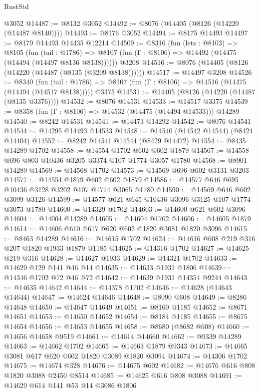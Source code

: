 \begin{lexlean}{RustStd}
\begin{coremodule}
    @3052
@14487 := @8132 @3052
@14492 := @8076 (@14405 (@8126 (@14220 (@14487 @8140))))
@14493 := @8176 @3052
@14494 := @8175 @14493
@14497 := @8179 @14493 @14435 @12214
@14509 := @8316
    (fun (lets : @8103) =>
    @8105
      (fun (tail : @1786) =>
      @8107 (fun (Γ : @8106) => @14492 (@14475 (@14494 (@14497 @8136 @8138))))))
    @3208
@14516 := @8076 (@14405 (@8126 (@14220 (@14487 (@8135 (@3209 @8138))))))
@14517 := @14497 @3208
@14526 := @8340
    (fun (tail : @1786) => @8107 (fun (Γ : @8106) => @14516 (@14475 (@14494 (@14517 @8138)))))
    @3375
@14531 := @14405 (@8126 (@14220 (@14487 (@8135 @3376))))
@14532 := @8076 @14531
@14533 := @14517 @3375
@14539 := @8358 (fun (Γ : @8106) => @14532 (@14475 (@14494 @14533))) @14289
@14540 := @8242 @14531
@14541 := @14473 @14292
@14542 := @8076 @14541
@14544 := @14295 @14493 @14533
@14548 := @14540 (@14542 @14544) (@8424 @14404)
@14552 := @8242 @14541 @14544 (@8429 @14472)
@14554 := @8435 @14289 @1702
@14558 := @14554 @1702 @602 @602 @1879
@14567 := @14558 @696 @803 @10436 @3205 @3374 @107 @1774 @3057 @1780
@14568 := @8901 @14289
@14569 := @14568 @1702
@14573 := @14569 @696 @602 @3131 @3203
@14577 := @14554 @1879 @602 @602 @1879
@14586 := @14577 @646 @695 @10436 @3128 @3202 @107 @1774 @3065 @1780
@14590 := @14569 @646 @602 @3099 @3126
@14599 := @14577 @621 @645 @10436 @3096 @3125 @107 @1774 @3073 @1780
@14600 := @14329 @1702
@14603 := @14600 @621 @602 @3096
@14604 := @14004 @14289
@14605 := @14604 @1702
@14606 := @14605 @1879
@14614 := @14606 @610 @617 @620 @602 @1820 @3081 @1820 @3096
@14615 := @8463 @14289
@14616 := @14615 @1702
@14624 := @14616 @608 @219 @316 @207 @1820 @1933 @1879 @1185
@14625 := @14316 @1702
@14627 := @14625 @219 @316
@14628 := @14627 @1933
@14629 := @14321 @1702
@14633 := @14629 @129 @141 @46 @14
@14635 := @14633 @1931 @1806
@14639 := @14346 @1702 @72 @46 @72
@14642 := @14639 @1931 @14354 @9244
@14643 := @14635 @14642
@14644 := @14378 @1702
@14646 := @14628 (@14643 @14644)
@14647 := @14624 @14646
@14648 := @8090 @608
@14649 := @8286 @14648
@14650 := @14647 @14649
@14651 := @8160 @1185
@14652 := @8671 @14651
@14653 := @14650 @14652
@14654 := @8184 @1185
@14655 := @8675 @14654
@14656 := @14653 @14655
@14658 := @8680 (@8682 @608)
@14660 := @14656 @14658 @9519
@14661 := @14614 @14660
@14662 := @9339 @14289
@14663 := @14662 @1702
@14665 := @14663 @1879 @9343
@14673 := @14665 @3081 @617 @620 @602 @1820 @3089 @1820 @3094
@14674 := @14306 @1702
@14675 := @14674 @328
@14676 := @14675 @602
@14682 := @14676 @616 @808 @1820 @3088 @2450 @8514
@14685 := @14625 @616 @808 @3088
@14691 := @14629 @614 @141 @53 @14 @3086 @1806

\end{coremodule}
\end{lexlean}
